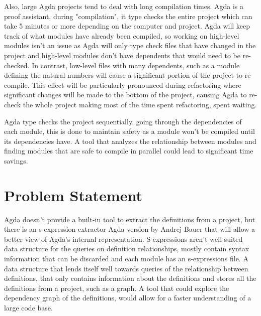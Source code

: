 Also, large Agda projects tend to deal with long compilation times. Agda is a
proof assistant, during "compilation", it type checks the entire project which
can take 5 minutes or more depending on the computer and project. Agda will
keep track of what modules have already been compiled, so working on high-level
modules isn't an issue as Agda will only type check files that have changed in
the project and high-level modules don't have dependents that would need to be
re-checked. In contrast, low-level files with many dependents, such as a module
defining the natural numbers will cause a significant portion of the project
to re-compile. This effect will be particularly pronounced during refactoring
where significant changes will be made to the bottom of the project, causing
Agda to re-check the whole project making most of the time spent refactoring,
spent waiting. 

Agda type checks the project sequentially, going through the dependencies of
each module, this is done to maintain safety as a module won't be compiled
until its dependencies have. A tool that analyzes the relationship between
modules and finding modules that are safe to compile in parallel could lead to
significant time savings.




\section{Problem Statement}

Agda doesn't provide a built-in tool to extract the definitions from a project,
but there is an s-expression extractor Agda version by Andrej Bauer
\cite{andrej} that will allow a better view of Agda's internal
representation. S-expressions aren't well-suited data structure for the queries
on definition relationships, mostly contain syntax information that can be
discarded and each module has an s-expressions file. A data structure that
lends itself well towards queries of the relationship between definitions, that
only contains information about the definitions and stores all the definitions
from a project, such as a graph. A tool that could explore the dependency graph
of the definitions, would allow for a faster understanding of a large code
base.

